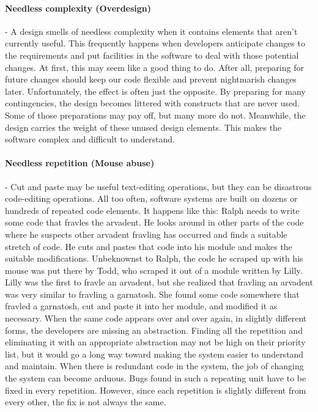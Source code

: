 \documentclass{llncs}
\begin{document}
\paragraph{Needless complexity (Overdesign)} - A design smells of needless complexity when it contains elements that aren't currently useful.
This frequently happens when developers anticipate changes to the requirements and put facilities in the software to deal with those potential changes. At first, this may seem like a good thing to do.
After all, preparing for future changes should keep our code flexible and prevent nightmarish changes later.
Unfortunately, the effect is often just the opposite. By preparing for many contingencies, the design becomes littered with constructs that are never used. Some of those preparations may pay off, but many more do not. 
Meanwhile, the design carries the weight of these unused design elements.
This makes the software complex and difficult to understand.

\paragraph{Needless repetition (Mouse abuse)} - Cut and paste may be useful text-editing operations, but they can be disastrous code-editing operations. 
All too often, software systems are built on dozens or hundreds of repeated code elements. 
It happens like this: Ralph needs to write some code that fravles the arvadent.
He looks around in other parts of the code where he suspects other arvadent fravling has occurred and finds a suitable stretch of code.
He cuts and pastes that code into his module and makes the suitable modifications.
Unbeknownst to Ralph, the code he scraped up with his mouse was put there by Todd, who scraped it out of a module written by Lilly. 
Lilly was the first to fravle an arvadent, but she realized that fravling an arvadent was very similar to fravling a garnatosh. 
She found some code somewhere that fravled a garnatosh, cut and paste it into her module, and modified it as necessary.
When the same code appears over and over again, in slightly different forms, the developers are missing an abstraction.
Finding all the repetition and eliminating it with an appropriate abstraction may not be high on their priority list, but it would go a long way toward making the system easier to understand and maintain.
When there is redundant code in the system, the job of changing the system can become arduous.
Bugs found in such a repeating unit have to be fixed in every repetition.
However, since each repetition is slightly different from every other, the fix is not always the same.
\end{document}
